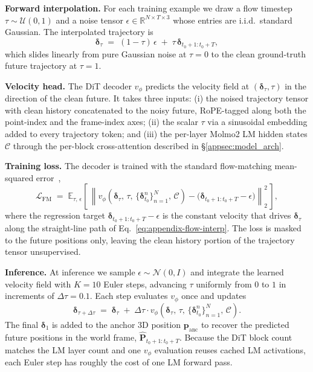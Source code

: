 \documentclass{llmxive}
\begin{document}
\noindent\textbf{Forward interpolation.}
For each training example we draw a flow timestep $\tau \sim \mathcal{U}(0,1)$
and a noise tensor $\epsilon \in \mathbb{R}^{N \times T \times 3}$ whose
entries are i.i.d.\ standard Gaussian. The interpolated trajectory is
\begin{equation}
\boldsymbol{\delta}_{\tau}
\;=\;
(1-\tau)\,\epsilon
\;+\;
\tau\,\boldsymbol{\delta}_{t_0+1:t_0+T} ,
\label{eq:appendix-flow-interp}
\end{equation}
which slides linearly from pure Gaussian noise at $\tau=0$ to the clean
ground-truth future trajectory at $\tau=1$.

\noindent\textbf{Velocity head.}
The DiT decoder $v_\phi$ predicts the velocity field at $(\boldsymbol{\delta}_\tau, \tau)$
in the direction of the clean future. It takes three inputs:
(i) the noised trajectory tensor with clean history concatenated to the noisy
future, RoPE-tagged along both the point-index and the frame-index axes;
(ii) the scalar $\tau$ via a sinusoidal embedding added to every trajectory
token; and (iii) the per-layer Molmo2 LM hidden states $\mathcal{C}$
through the per-block cross-attention described in
\S\ref{appsec:model_arch}.

\noindent\textbf{Training loss.}
The decoder is trained with the standard
flow-matching mean-squared error~\cite{lipman2023flowmatching},
\begin{equation}
\mathcal{L}_{\mathrm{FM}}
\;=\;
\mathbb{E}_{\tau,\,\epsilon}
\!\left[\,
\left\|
v_{\phi}\!\left(
\boldsymbol{\delta}_{\tau},\,\tau,\,
\{\boldsymbol{\delta}_{t_0}^{n}\}_{n=1}^{N},\,
\mathcal{C}
\right)
-
\bigl(
\boldsymbol{\delta}_{t_0+1:t_0+T} - \epsilon
\bigr)
\right\|_2^2
\,\right] ,
\label{eq:appendix-flow-loss}
\end{equation}
where the regression target $\boldsymbol{\delta}_{t_0+1:t_0+T} - \epsilon$
is the constant velocity that drives $\boldsymbol{\delta}_\tau$ along the
straight-line path of Eq.~\eqref{eq:appendix-flow-interp}. The loss is
masked to the future positions only, leaving the clean history portion of
the trajectory tensor unsupervised.

\noindent\textbf{Inference.}
At inference we sample $\epsilon \sim \mathcal{N}(0, I)$ and integrate the
learned velocity field with $K=10$ Euler steps, advancing $\tau$ uniformly
from $0$ to $1$ in increments of $\Delta\tau = 0.1$. Each step evaluates
$v_\phi$ once and updates
\begin{equation}
\boldsymbol{\delta}_{\tau + \Delta\tau}
\;=\;
\boldsymbol{\delta}_{\tau}
\;+\;
\Delta\tau \cdot
v_{\phi}\!\left(
\boldsymbol{\delta}_{\tau},\,\tau,\,
\{\boldsymbol{\delta}_{t_0}^{n}\}_{n=1}^{N},\,
\mathcal{C}
\right) .
\label{eq:appendix-euler}
\end{equation}
The final $\boldsymbol{\delta}_1$ is added to the anchor 3D position
$\mathbf{p}_{\mathrm{anc}}$ to recover the predicted future positions in
the world frame, $\hat{\mathbf{P}}_{t_0+1:t_0+T}$. Because the DiT block
count matches the LM layer count and one $v_\phi$ evaluation reuses cached
LM activations, each Euler step has roughly the cost of one LM forward
pass.
\end{document}
